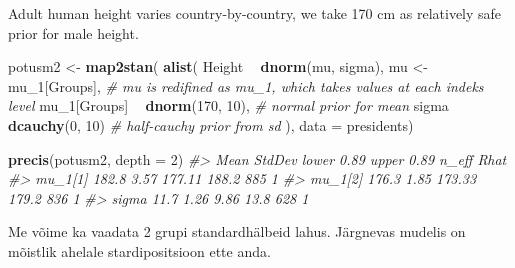 \documentclass[]{book}
\newenvironment{Shaded}{\begin{snugshade}}{\end{snugshade}}
\newcommand{\KeywordTok}[1]{\textcolor[rgb]{0.13,0.29,0.53}{\textbf{#1}}}
\newcommand{\DataTypeTok}[1]{\textcolor[rgb]{0.13,0.29,0.53}{#1}}
\newcommand{\DecValTok}[1]{\textcolor[rgb]{0.00,0.00,0.81}{#1}}
\newcommand{\StringTok}[1]{\textcolor[rgb]{0.31,0.60,0.02}{#1}}
\newcommand{\CommentTok}[1]{\textcolor[rgb]{0.56,0.35,0.01}{\textit{#1}}}
\newcommand{\OperatorTok}[1]{\textcolor[rgb]{0.81,0.36,0.00}{\textbf{#1}}}
\newcommand{\NormalTok}[1]{#1}
\begin{document}
Adult human height varies country-by-country, we take 170 cm as
relatively safe prior for male height.

\begin{Shaded}
\begin{Highlighting}[]
\NormalTok{potusm2 <-}\StringTok{ }\KeywordTok{map2stan}\NormalTok{(}
  \KeywordTok{alist}\NormalTok{(}
\NormalTok{    Height }\OperatorTok{~}\StringTok{ }\KeywordTok{dnorm}\NormalTok{(mu, sigma),}
\NormalTok{    mu <-}\StringTok{ }\NormalTok{mu_}\DecValTok{1}\NormalTok{[Groups], }\CommentTok{# mu is redifined as mu_1, which takes values at each indeks level}
\NormalTok{    mu_}\DecValTok{1}\NormalTok{[Groups] }\OperatorTok{~}\StringTok{ }\KeywordTok{dnorm}\NormalTok{(}\DecValTok{170}\NormalTok{, }\DecValTok{10}\NormalTok{), }\CommentTok{# normal prior for mean}
\NormalTok{    sigma }\OperatorTok{~}\StringTok{ }\KeywordTok{dcauchy}\NormalTok{(}\DecValTok{0}\NormalTok{, }\DecValTok{10}\NormalTok{) }\CommentTok{# half-cauchy prior from sd }
\NormalTok{  ),}
  \DataTypeTok{data =}\NormalTok{ presidents)}
\end{Highlighting}
\end{Shaded}

\begin{Shaded}
\begin{Highlighting}[]
\KeywordTok{precis}\NormalTok{(potusm2, }\DataTypeTok{depth =} \DecValTok{2}\NormalTok{)}
\CommentTok{#>          Mean StdDev lower 0.89 upper 0.89 n_eff Rhat}
\CommentTok{#> mu_1[1] 182.8   3.57     177.11      188.2   885    1}
\CommentTok{#> mu_1[2] 176.3   1.85     173.33      179.2   836    1}
\CommentTok{#> sigma    11.7   1.26       9.86       13.8   628    1}
\end{Highlighting}
\end{Shaded}

Me võime ka vaadata 2 grupi standardhälbeid lahus. Järgnevas mudelis on
mõistlik ahelale stardipositsioon ette anda.
\end{document}
